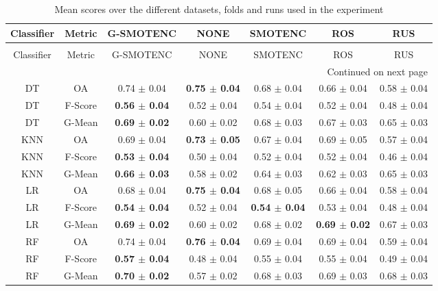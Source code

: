 \begin{longtable}{ccccccc}
\caption{Mean scores over the different datasets, folds and runs used in the experiment}
\label{tbl:mean_sem_scores}\\
\toprule
Classifier &  Metric &                G-SMOTENC &                     NONE &                  SMOTENC &                      ROS &             RUS \\
\midrule
\endfirsthead
\caption[]{Mean scores over the different datasets, folds and runs used in the experiment} \\
\toprule
Classifier &  Metric &                G-SMOTENC &                     NONE &                  SMOTENC &                      ROS &             RUS \\
\midrule
\endhead
\midrule
\multicolumn{7}{r}{{Continued on next page}} \\
\midrule
\endfoot

\bottomrule
\endlastfoot
        DT &      OA &          0.74 $\pm$ 0.04 & \textbf{0.75 $\pm$ 0.04} &          0.68 $\pm$ 0.04 &          0.66 $\pm$ 0.04 & 0.58 $\pm$ 0.04 \\
        DT & F-Score & \textbf{0.56 $\pm$ 0.04} &          0.52 $\pm$ 0.04 &          0.54 $\pm$ 0.04 &          0.52 $\pm$ 0.04 & 0.48 $\pm$ 0.04 \\
        DT &  G-Mean & \textbf{0.69 $\pm$ 0.02} &          0.60 $\pm$ 0.02 &          0.68 $\pm$ 0.03 &          0.67 $\pm$ 0.03 & 0.65 $\pm$ 0.03 \\
       KNN &      OA &          0.69 $\pm$ 0.04 & \textbf{0.73 $\pm$ 0.05} &          0.67 $\pm$ 0.04 &          0.69 $\pm$ 0.05 & 0.57 $\pm$ 0.04 \\
       KNN & F-Score & \textbf{0.53 $\pm$ 0.04} &          0.50 $\pm$ 0.04 &          0.52 $\pm$ 0.04 &          0.52 $\pm$ 0.04 & 0.46 $\pm$ 0.04 \\
       KNN &  G-Mean & \textbf{0.66 $\pm$ 0.03} &          0.58 $\pm$ 0.02 &          0.64 $\pm$ 0.03 &          0.62 $\pm$ 0.03 & 0.65 $\pm$ 0.03 \\
        LR &      OA &          0.68 $\pm$ 0.04 & \textbf{0.75 $\pm$ 0.04} &          0.68 $\pm$ 0.05 &          0.66 $\pm$ 0.04 & 0.58 $\pm$ 0.04 \\
        LR & F-Score & \textbf{0.54 $\pm$ 0.04} &          0.52 $\pm$ 0.04 & \textbf{0.54 $\pm$ 0.04} &          0.53 $\pm$ 0.04 & 0.48 $\pm$ 0.04 \\
        LR &  G-Mean & \textbf{0.69 $\pm$ 0.02} &          0.60 $\pm$ 0.02 &          0.68 $\pm$ 0.02 & \textbf{0.69 $\pm$ 0.02} & 0.67 $\pm$ 0.03 \\
        RF &      OA &          0.74 $\pm$ 0.04 & \textbf{0.76 $\pm$ 0.04} &          0.69 $\pm$ 0.04 &          0.69 $\pm$ 0.04 & 0.59 $\pm$ 0.04 \\
        RF & F-Score & \textbf{0.57 $\pm$ 0.04} &          0.48 $\pm$ 0.04 &          0.55 $\pm$ 0.04 &          0.55 $\pm$ 0.04 & 0.49 $\pm$ 0.04 \\
        RF &  G-Mean & \textbf{0.70 $\pm$ 0.02} &          0.57 $\pm$ 0.02 &          0.68 $\pm$ 0.03 &          0.69 $\pm$ 0.03 & 0.68 $\pm$ 0.03 \\
\end{longtable}

